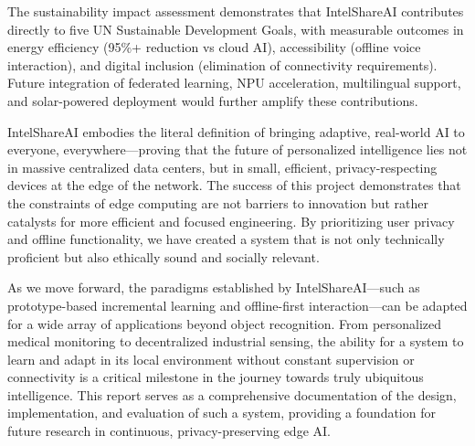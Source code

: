 \documentclass[12pt,a4paper]{report}
\begin{document}
The sustainability impact assessment demonstrates that IntelShareAI contributes directly to five UN Sustainable Development Goals, with measurable outcomes in energy efficiency (95\%+ reduction vs cloud AI), accessibility (offline voice interaction), and digital inclusion (elimination of connectivity requirements). Future integration of federated learning, NPU acceleration, multilingual support, and solar-powered deployment would further amplify these contributions.

IntelShareAI embodies the literal definition of bringing adaptive, real-world AI to everyone, everywhere---proving that the future of personalized intelligence lies not in massive centralized data centers, but in small, efficient, privacy-respecting devices at the edge of the network. The success of this project demonstrates that the constraints of edge computing are not barriers to innovation but rather catalysts for more efficient and focused engineering. By prioritizing user privacy and offline functionality, we have created a system that is not only technically proficient but also ethically sound and socially relevant.

As we move forward, the paradigms established by IntelShareAI---such as prototype-based incremental learning and offline-first interaction---can be adapted for a wide array of applications beyond object recognition. From personalized medical monitoring to decentralized industrial sensing, the ability for a system to learn and adapt in its local environment without constant supervision or connectivity is a critical milestone in the journey towards truly ubiquitous intelligence. This report serves as a comprehensive documentation of the design, implementation, and evaluation of such a system, providing a foundation for future research in continuous, privacy-preserving edge AI.
\end{document}
